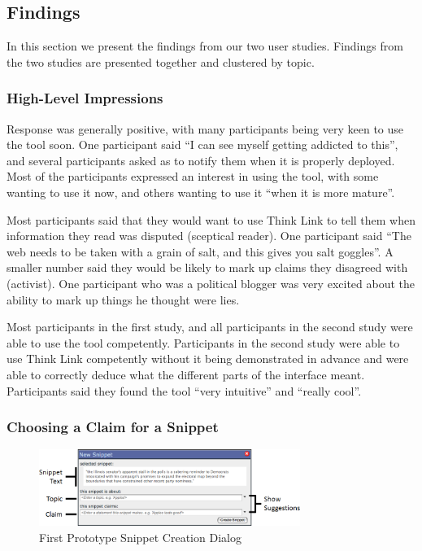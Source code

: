 \documentclass{chi2009}
\begin{document}
\subsection{Findings}

In this section we present the findings from our two user studies. Findings from the two studies are presented together and clustered by topic.

\subsubsection{High-Level Impressions}

Response was generally positive, with many participants being very keen to use the tool soon. One participant said ``I can see myself getting addicted to this'', and several participants asked as to notify them when it is properly deployed. Most of the participants expressed an interest in using the tool, with some wanting to use it now, and others wanting to use it ``when it is more mature''.

Most participants said that they would want to use Think Link to tell them when information they read was disputed (sceptical reader). One participant said ``The web needs to be taken with a grain of salt, and this gives you salt goggles''. A smaller number said they would be likely to mark up claims they disagreed with (activist). One participant who was a political blogger was very excited about the ability to mark up things he thought were lies.

Most participants in the first study, and all participants in the second study were able to use the tool competently. Participants in the second study were able to use Think Link competently without it being demonstrated in advance and were able to correctly deduce what the different parts of the interface meant. Participants said they found the tool ``very intuitive'' and ``really cool''.

\subsubsection{Choosing a Claim for a Snippet}

\begin{figure}[t]
	\includegraphics[width=8.5cm]{../screenshots/oldsnipcreate_diagram.png}
	\caption{First Prototype Snippet Creation Dialog}
	\label{oldsnippetbox}
\end{figure}
\end{document}
